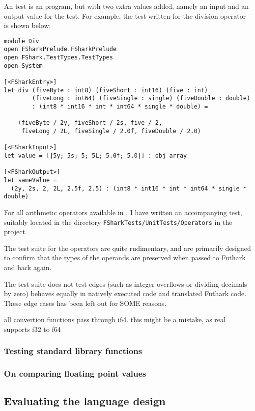 An \fshark{} test is an \fshark{} program, but with two extra values added,
namely an input and an output value for the test. For example, the test written for the
division operator is shown below:
\begin{verbatim}
module Div
open FSharkPrelude.FSharkPrelude
open FShark.TestTypes.TestTypes
open System

[<FSharkEntry>]
let div (fiveByte : int8) (fiveShort : int16) (five : int) 
        (fiveLong : int64) (fiveSingle : single) (fiveDouble : double) 
        : (int8 * int16 * int * int64 * single * double) =

    (fiveByte / 2y, fiveShort / 2s, five / 2, 
     fiveLong / 2L, fiveSingle / 2.0f, fiveDouble / 2.0)

[<FSharkInput>]
let value = [|5y; 5s; 5; 5L; 5.0f; 5.0|] : obj array

[<FSharkOutput>]
let sameValue = 
  (2y, 2s, 2, 2L, 2.5f, 2.5) : (int8 * int16 * int * int64 * single * double)
\end{verbatim}
For all arithmetic operators available in \fshark{}, I have written an
accompanying test, suitably located in the directory
\texttt{FSharkTests/UnitTests/Operators} in the \fshark{} project.

The test suite for the operators are quite rudimentary, and are primarily
designed to confirm that the types of the operands are preserved when passed to
Futhark \csharp{} and back again.

The test suite does not test edges (such as integer overflows or dividing
decimals by zero) behaves equally in natively executed \fshark{} code and
translated Futhark \csharp{} code.
These edge cases has been left out for SOME reasons.

all convertion functions pass through i64. this might be a mistake, as real
supports f32 to f64

\subsubsection*{Testing \fsharp{} standard library functions}

\subsubsection{On comparing floating point values}



\subsection{Evaluating the \fshark{} language design}

